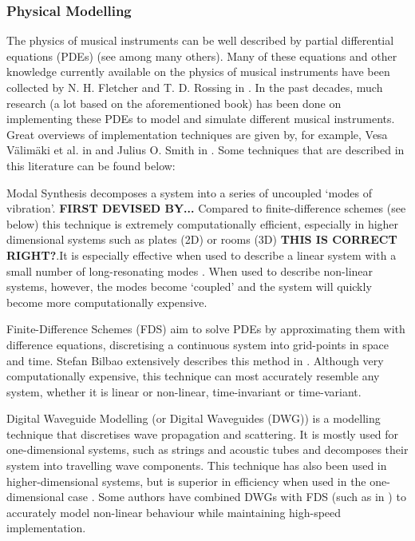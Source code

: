 \subsubsection*{Physical Modelling}
The physics of musical instruments can be well described by partial differential equations (PDEs) (see \cite{Bilbao2009} among many others). Many of these equations and other knowledge currently available on the physics of musical instruments have been collected by N. H. Fletcher and T. D. Rossing in \cite{Fletcher1998}. In the past decades, much research (a lot based on the aforementioned book) has been done on implementing these PDEs to model and simulate different musical instruments. Great overviews of implementation techniques are given by, for example, Vesa Välimäki et al. in \cite{Valimaki2006} and Julius O. Smith in \cite{Smith2010a, Smith2010b}. Some techniques that are described in this literature can be found below:

Modal Synthesis decomposes a system into a series of uncoupled ‘modes of vibration’. \textbf{FIRST DEVISED BY...} Compared to finite-difference schemes (see below) this technique is extremely computationally efficient, especially in higher dimensional systems such as plates (2D) or rooms (3D) \textbf{THIS IS CORRECT RIGHT?}.It is especially effective when used to describe a linear system \cite{Bilbao2018} with a small number of long-resonating modes \cite{Smith2010a}. When used to describe non-linear systems, however, the modes become `coupled’ and the system will quickly become more computationally expensive. 

Finite-Difference Schemes (FDS) aim to solve PDEs by approximating them with difference equations, discretising a continuous system into grid-points in space and time. Stefan Bilbao extensively describes this method in \cite{Bilbao2009, Bilbao2018}. Although very computationally expensive, this technique can most accurately resemble any system, whether it is linear or non-linear, time-invariant or time-variant.

Digital Waveguide Modelling (or Digital Waveguides (DWG)) is a modelling technique that discretises wave propagation and scattering. It is mostly used for one-dimensional systems, such as strings and acoustic tubes and decomposes their system into travelling wave components. This technique has also been used in higher-dimensional systems, but is superior in efficiency when used in the one-dimensional case \cite{Valimaki2006}. Some authors have combined DWGs with FDS (such as in \cite{Erkut2002, Maestre2014}) to accurately model non-linear behaviour while maintaining high-speed implementation.

